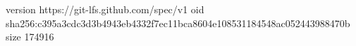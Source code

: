 version https://git-lfs.github.com/spec/v1
oid sha256:c395a3cdc3d3b4943eb4332f7ec11bca8604e108531184548ac052443988470b
size 174916
